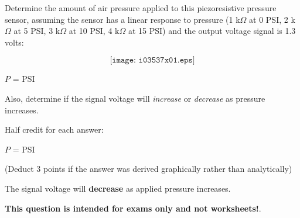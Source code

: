 

Determine the amount of air pressure applied to this piezoresistive pressure sensor, assuming the sensor has a linear response to pressure (1 k$\Omega$ at 0 PSI, 2 k$\Omega$ at 5 PSI, 3 k$\Omega$ at 10 PSI, 4 k$\Omega$ at 15 PSI) and the output voltage signal is 1.3 volts:

$$\texttt{[image: i03537x01.eps]}$$

$P$ = \underbar{\hskip 50pt} PSI

\vskip 10pt

Also, determine if the signal voltage will {\it increase} or {\it decrease} as pressure increases.







\noindent
Half credit for each answer:

\vskip 10pt

$P$ =  PSI

\vskip 10pt

(Deduct 3 points if the answer was derived graphically rather than analytically)

\vskip 10pt

The signal voltage will {\bf decrease} as applied pressure increases.








{\bf This question is intended for exams only and not worksheets!}.



